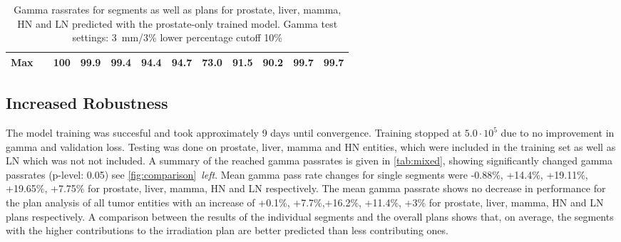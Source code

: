 \begin{table}
{\begin{tabular}{|lccccccccccc|}
            \textbf{Max}                       &                      & 100               & 99.9              & 99.4             & 94.4            & 94.7             & 73.0            & 91.5            & 90.2            & 99.7            & 99.7           \\ \hline
            \end{tabular}}
    \caption{Gamma rassrates for segments as well as plans for prostate, liver, mamma, \acs{HN} and \acs{LN} predicted with the prostate-only trained model. Gamma test settings: 3~mm/3\% lower percentage cutoff 10\%}\label{tab:prost}
\end{table}


\subsection{Increased Robustness}

The model training was succesful and took approximately 9 days until convergence. Training stopped at $5.0\cdot10^5$ due to no improvement in gamma and validation loss. 
Testing was done on prostate, liver, mamma and \acs{HN} entities, which were included in the training set as well as \acs{LN} which was not not included. 
A summary of the reached gamma passrates is given in \autoref{tab:mixed}, showing significantly changed gamma passrates (p-level: 0.05) see \autoref{fig:comparison}~\emph{left}.
Mean gamma pass rate changes for single segments were -0.88\%, +14.4\%, +19.11\%, +19.65\%, +7.75\% for prostate, liver, mamma, \acs{HN} and \acs{LN} respectively. 
The mean gamma passrate shows no decrease in performance for the plan analysis of all tumor entities with an increase of  +0.1\%,  +7.7\%,+16.2\%, +11.4\%, +3\% for prostate, liver, mamma, \acs{HN} and \acs{LN} plans respectively. 
A comparison between the results of the individual segments and the overall plans shows that, on average, the segments with the higher contributions to the irradiation plan are better predicted than less contributing ones. 

